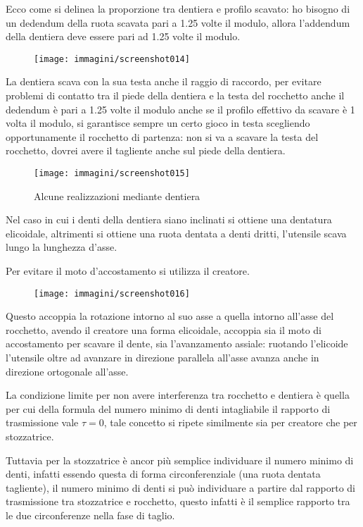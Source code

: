 \documentclass[a4paper, 15pt]{article}
\begin{document}
\begin{adjustwidth}{2in}{}
		Ecco come si delinea la proporzione tra dentiera e profilo scavato: ho bisogno di un dedendum della ruota scavata pari a 1.25 volte il modulo, allora l'addendum della dentiera deve essere pari ad 1.25 volte il modulo.
		\begin{figure}[H]
			\centering
			\texttt{[image: immagini/screenshot014]}
			\label{fig:screenshot014}
		\end{figure}		
		La dentiera scava con la sua testa anche il raggio di raccordo, per evitare problemi di contatto tra il piede della dentiera e la testa del rocchetto anche il dedendum è pari a 1.25 volte il modulo anche se il profilo effettivo da scavare è 1 volta il modulo, si garantisce sempre un certo gioco in testa scegliendo opportunamente il rocchetto di partenza: non si va a scavare la testa del rocchetto, dovrei avere il tagliente anche sul piede della dentiera.
		\begin{figure}[H]
			\centering
			\texttt{[image: immagini/screenshot015]}
			\caption{Alcune realizzazioni mediante dentiera}
			\label{fig:screenshot015}
		\end{figure}
		Nel caso in cui i denti della dentiera siano inclinati si ottiene una dentatura elicoidale, altrimenti si ottiene una ruota dentata a denti dritti, l'utensile scava lungo la lunghezza d'asse. \newline 
		
		Per evitare il moto d'accostamento si utilizza il creatore.
		\begin{figure}[H]
			\centering
			\texttt{[image: immagini/screenshot016]}
			\label{fig:screenshot016}
		\end{figure}
		Questo accoppia la rotazione intorno al suo asse a quella intorno all'asse del rocchetto, avendo il creatore una forma elicoidale, accoppia sia il moto di accostamento per scavare il dente, sia l'avanzamento assiale: ruotando l'elicoide l'utensile oltre ad avanzare in direzione parallela all'asse avanza anche in direzione ortogonale all'asse. \newline
		
		La condizione limite per non avere interferenza tra rocchetto e dentiera è quella per cui della formula del numero minimo di denti intagliabile il rapporto di trasmissione vale $\tau=0$, tale concetto si ripete similmente sia per creatore che per stozzatrice. 
		
		Tuttavia per la stozzatrice è ancor più semplice individuare il numero minimo di denti, infatti essendo questa di forma circonferenziale (una ruota dentata tagliente), il numero minimo di denti si può individuare a partire dal rapporto di trasmissione tra stozzatrice e rocchetto, questo infatti è il semplice rapporto tra le due circonferenze nella fase di taglio. 


\end{adjustwidth}
\end{document}
